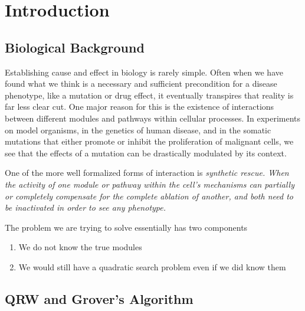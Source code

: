 \documentclass[a4paper,english]{article}
\title{}
\author{}
\date{}
\begin{document}
\maketitle


\section{Introduction}
\subsection{Biological Background}

Establishing cause and effect in biology is rarely simple. 
Often when we have  found what we think is a necessary and sufficient precondition for a disease phenotype, like a mutation or drug effect, 
it eventually transpires that reality is far less clear cut.
One major reason for this is the existence of interactions between different modules and pathways within cellular processes. 
In experiments on model organisms, in the genetics of human disease, 
and in the somatic mutations that either promote or inhibit the proliferation of malignant cells, 
we see that the effects of a mutation can be drastically modulated by its context. 


One of the more well formalized forms of interaction is \em{synthetic rescue}.
When the activity of one module or pathway within the cell's mechanisms 
can partially or completely compensate for the complete ablation of another, 
and both need to be inactivated in order to see any phenotype. 




The problem we are trying to solve essentially has two components %

\begin{enumerate}
    \item We do not know the true modules
    \item We would still have a quadratic search problem even if we did know them
\end{enumerate}



\subsection{QRW and Grover's Algorithm}
\end{document}
